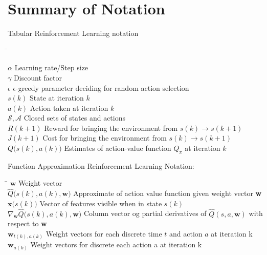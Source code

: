 \chapter*{Summary of Notation}

{\Large Tabular Reinforcement Learning notation}
\begin{tabbing}
	\hspace{40mm} \= \kill
	
	$\alpha$ \> Learning rate/Step size \\
	$\gamma$ \> Discount factor \\
	$ \epsilon $ \> $ \epsilon $-greedy parameter deciding for random action selection \\
	$ s(k) $ \> State at iteration $ k $\\
	$ a(k) $ \> Action taken at iteration $ k $ \\
	$ \mathcal{S},\mathcal{A} $ \> Closed sets of states and actions \\
	$ R(k+1) $ \> Reward for bringing the environment from $ s(k) \rightarrow s(k+1) $ \\
	$ J(k+1) $ \> Cost for bringing the environment from $ s(k) \rightarrow s(k+1) $ \\
	$ Q\bigg(s(k),a(k)\bigg) $ \> Estimates of action-value function $ Q_{\pi} $ at iteration $ k $ \\
\end{tabbing}

{\Large Function Approximation Reinforcement Learning Notation:}
\begin{tabbing}
	\hspace{40mm} \= \kill
	$ \textbf{w} $ \> Weight vector \\ 
	$ \hat{Q}\bigg(s(k),a(k),\textbf{w}\bigg) $ \> Approximate of action value function given weight vector \textbf{w}\\
	$ \textbf{x}\bigg(s(k)\bigg) $\> Vector of features visible when in state $ s(k) $ \\
	$ \nabla_{\textbf{w}} \hat{Q}\bigg(s(k),a(k),\textbf{w}\bigg) $ \> Column vector og partial derivatives of $ \hat{Q}(s,a,\textbf{w}) $ with respect to \textbf{w}\\
	$\textbf{w}_{t(k),a(k)}$ \> Weight vectors for each discrete time $ t $ and action $ a $ at iteration k \\
	$\textbf{w}_{a(k)}$ \> Weight vectors for discrete each action a at iteration k \\
\end{tabbing}

